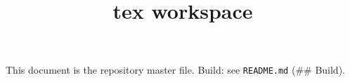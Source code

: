\documentclass{article}
\begin{document}
\title{tex workspace}
\author{}
\date{}
\maketitle

This document is the repository master file. Build: see \texttt{README.md} (\#\# Build).
\end{document}
